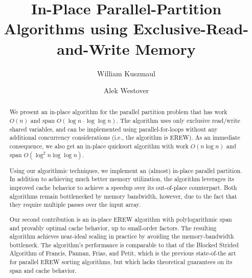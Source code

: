 \documentclass[sigplan, 10pt, nonacm]{acmart}
\theoremstyle{remark}
\theoremstyle{remark}
\begin{document}
\title[]{In-Place Parallel-Partition Algorithms using Exclusive-Read-and-Write Memory}
\subtitle{}

\author{William Kuszmaul}


\author{Alek Westover}


\renewcommand{\shortauthors}{William Kuszmaul and Alek Westover}


\begin{abstract}
We present an in-place algorithm for the parallel partition problem that has
work $O(n)$ and span $O(\log n \cdot \log \log n)$. The algorithm uses only
exclusive read/write shared variables, and can be implemented using
parallel-for-loops without any additional concurrency considerations (i.e., the
algorithm is EREW). As an immediate consequence, we also get an in-place
quicksort algorithm with work $O(n \log n)$ and span $O(\log^2 n \log \log n)$.

Using our algorithmic techniques, we implement an (almost) in-place parallel
partition. In addition to achieving much better memory utilization, the
algorithm leverages its improved cache behavior to achieve a speedup over its
out-of-place counterpart. Both algorithms remain bottlenecked by memory
bandwidth, however, due to the fact that they require multiple passes over the
input array.

Our second contribution is an in-place EREW algorithm with polylogarithmic span
and provably optimal cache behavior, up to small-order factors.  The resulting
algorithm achieves near-ideal scaling in practice by avoiding the
memory-bandwidth bottleneck. The algorithm's performance is comparable to that of
the Blocked Strided Algorithm of Francis, Pannan, Frias, and Petit, which is
the previous state-of-the art for parallel EREW sorting algorithms, but which
lacks theoretical guarantees on its span and cache behavior.
\end{abstract}

%
%
\end{document}
